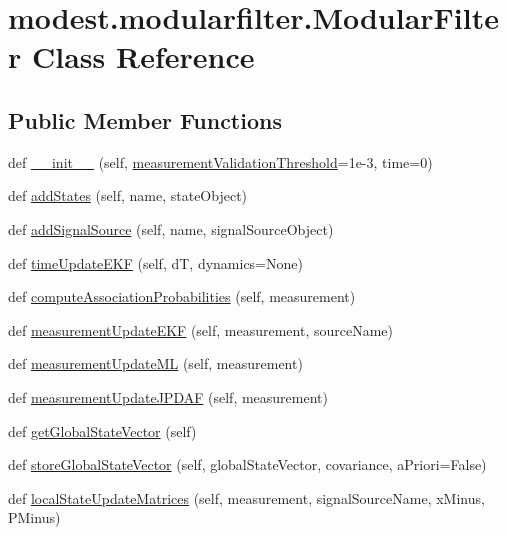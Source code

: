 \hypertarget{classmodest_1_1modularfilter_1_1ModularFilter}{}\section{modest.\+modularfilter.\+Modular\+Filter Class Reference}
\label{classmodest_1_1modularfilter_1_1ModularFilter}
\subsection*{Public Member Functions}
\begin{DoxyCompactItemize}
\item 
def \hyperlink{classmodest_1_1modularfilter_1_1ModularFilter_a20180f5a3fced416d2d7a8d25a4d962d}{\+\_\+\+\_\+init\+\_\+\+\_\+} (self, \hyperlink{classmodest_1_1modularfilter_1_1ModularFilter_af91295c2d8f45afe04386215b5fa39aa}{measurement\+Validation\+Threshold}=1e-\/3, time=0)
\item 
def \hyperlink{classmodest_1_1modularfilter_1_1ModularFilter_a6363266b6fbd79b2cb8071c853af60a0}{add\+States} (self, name, state\+Object)
\item 
def \hyperlink{classmodest_1_1modularfilter_1_1ModularFilter_a6833080d980ec89769625721fa8e103d}{add\+Signal\+Source} (self, name, signal\+Source\+Object)
\item 
def \hyperlink{classmodest_1_1modularfilter_1_1ModularFilter_a7487bb7b6cad0d3af34c100d14e2e0a8}{time\+Update\+E\+KF} (self, dT, dynamics=None)
\item 
def \hyperlink{classmodest_1_1modularfilter_1_1ModularFilter_a39d5e1ab6cb950e4854eb909c338372c}{compute\+Association\+Probabilities} (self, measurement)
\item 
def \hyperlink{classmodest_1_1modularfilter_1_1ModularFilter_a493ccf6845ed800d565f1d26d063592c}{measurement\+Update\+E\+KF} (self, measurement, source\+Name)
\item 
def \hyperlink{classmodest_1_1modularfilter_1_1ModularFilter_af1a7d5a4e219c494de176f94997ae110}{measurement\+Update\+ML} (self, measurement)
\item 
def \hyperlink{classmodest_1_1modularfilter_1_1ModularFilter_ac3a26e2a7672ceedf00c48723104d55c}{measurement\+Update\+J\+P\+D\+AF} (self, measurement)
\item 
def \hyperlink{classmodest_1_1modularfilter_1_1ModularFilter_a11fd7a3b3bcd145f32190f53462c974a}{get\+Global\+State\+Vector} (self)
\item 
def \hyperlink{classmodest_1_1modularfilter_1_1ModularFilter_a15412a15695827fc57a0609000a1c9c0}{store\+Global\+State\+Vector} (self, global\+State\+Vector, covariance, a\+Priori=False)
\item 
def \hyperlink{classmodest_1_1modularfilter_1_1ModularFilter_ab1dc914f4939e1219f4f2d0efbafd9dd}{local\+State\+Update\+Matrices} (self, measurement, signal\+Source\+Name, x\+Minus, P\+Minus)
\end{DoxyCompactItemize}
